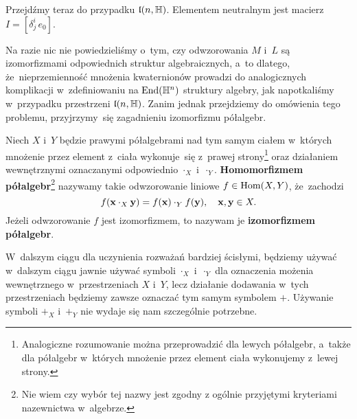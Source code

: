 \documentclass[a4paper,11pt]{article}
\begin{document}
Przejdźmy teraz do przypadku $\mathfrak{l}( n, \mathbb{H} )$. Elementem neutralnym jest macierz $I = [ \delta^{ i }_{ j } \, e_{ 0 } ]$.

Na razie nic nie powiedzieliśmy o~tym, czy odwzorowania $M$ i~$L$ są izomorfizmami odpowiednich struktur algebraicznych, a~to dlatego, że~nieprzemienność mnożenia kwaternionów prowadzi do analogicznych komplikacji w~zdefiniowaniu na $\mathrm{End}( \mathbb{H}^{ n } )$ struktury algebry, jak napotkaliśmy w~przypadku przestrzeni $\mathfrak{l}( n, \mathbb{H} )$. Zanim jednak przejdziemy do omówienia tego problemu, przyjrzymy~się zagadnieniu izomorfizmu półalgebr.

Niech $X$ i~$Y$ będzie prawymi półalgebrami nad tym samym ciałem w~których mnożenie przez element z~ciała wykonuje~się z~prawej strony\footnote{Analogiczne
  rozumowanie można przeprowadzić dla lewych półalgebr, a~także dla
  półalgebr w~których mnożenie przez element ciała wykonujemy z~lewej
  strony.} oraz działaniem wewnętrznymi oznaczanymi odpowiednio $\cdot_{ X }$
i~$\cdot_{ Y }$. \textbf{Homomorfizmem półalgebr}\footnote{Nie wiem czy wybór tej nazwy jest zgodny z ogólnie przyjętymi kryteriami nazewnictwa w~algebrze.} nazywamy takie odwzorowanie liniowe
$f \in \mathrm{Hom}( X, Y )$, że~zachodzi
\begin{equation}
  \label{eq:Wojtynski-68}
  f( \mathbf{x} \cdot_{ X } \mathbf{y} ) =
  f( \mathbf{x} ) \cdot_{ Y } f( \mathbf{y} ), \quad
  \mathbf{x}, \mathbf{y} \in X.
\end{equation}
Jeżeli odwzorowanie $f$ jest izomorfizmem, to nazywam je
\textbf{izomorfizmem półalgebr}.

W~dalszym ciągu dla uczynienia rozważań bardziej ścisłymi, będziemy używać
w~dalszym ciągu jawnie używać symboli $\cdot_{ X }$ i~$\cdot_{ Y }$ dla oznaczenia
możenia wewnętrznego w~przestrzeniach $X$ i~$Y$, lecz działanie dodawania
w~tych przestrzeniach będziemy zawsze oznaczać tym samym symbolem $+$. Używanie symboli $+_{ X }$ i~$+_{ Y }$ nie wydaje się nam szczególnie potrzebne.
\end{document}
